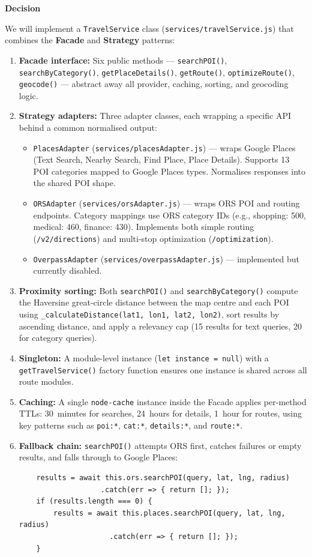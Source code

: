 \documentclass[12pt, a4paper]{article}
\newcommand{\code}[1]{\texttt{\small #1}}
\begin{document}
\begin{tcolorbox}[adrbox]
\vspace{0.6em}
\textbf{Decision}

We will implement a \code{TravelService} class (\code{services/travelService.js}) that combines the \textbf{Facade} and \textbf{Strategy} patterns:

\begin{enumerate}
  \item \textbf{Facade interface:} Six public methods --- \code{searchPOI()}, \code{searchByCategory()}, \code{getPlaceDetails()}, \code{getRoute()}, \code{optimizeRoute()}, \code{geocode()} --- abstract away all provider, caching, sorting, and geocoding logic.
  \item \textbf{Strategy adapters:} Three adapter classes, each wrapping a specific API behind a common normalised output:
    \begin{itemize}
      \item \code{PlacesAdapter} (\code{services/placesAdapter.js}) --- wraps Google Places (Text Search, Nearby Search, Find Place, Place Details). Supports 13 POI categories mapped to Google Places types. Normalises responses into the shared POI shape.
      \item \code{ORSAdapter} (\code{services/orsAdapter.js}) --- wraps ORS POI and routing endpoints. Category mappings use ORS category IDs (e.g., shopping: 500, medical: 460, finance: 430). Implements both simple routing (\code{/v2/directions}) and multi-stop optimization (\code{/optimization}).
      \item \code{OverpassAdapter} (\code{services/overpassAdapter.js}) --- implemented but currently disabled.
    \end{itemize}
  \item \textbf{Proximity sorting:} Both \code{searchPOI()} and \code{searchByCategory()} compute the Haversine great-circle distance between the map centre and each POI using \code{\_calculateDistance(lat1, lon1, lat2, lon2)}, sort results by ascending distance, and apply a relevancy cap (15 results for text queries, 20 for category queries).
  \item \textbf{Singleton:} A module-level instance (\code{let instance = null}) with a \code{getTravelService()} factory function ensures one instance is shared across all route modules.
  \item \textbf{Caching:} A single \code{node-cache} instance inside the Facade applies per-method TTLs: 30~minutes for searches, 24~hours for details, 1~hour for routes, using key patterns such as \code{poi:*}, \code{cat:*}, \code{details:*}, and \code{route:*}.
  \item \textbf{Fallback chain:} \code{searchPOI()} attempts ORS first, catches failures or empty results, and falls through to Google Places:
  \begin{verbatim}
    results = await this.ors.searchPOI(query, lat, lng, radius)
                   .catch(err => { return []; });
    if (results.length === 0) {
        results = await this.places.searchPOI(query, lat, lng, radius)
                     .catch(err => { return []; });
    }
  \end{verbatim}
\end{enumerate}


\end{tcolorbox}
\end{document}
